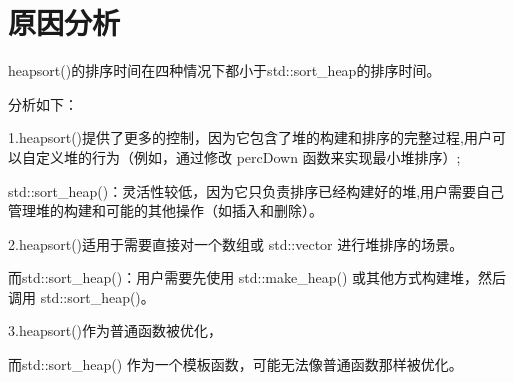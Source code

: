 \documentclass[UTF8]{ctexart}
\begin{document}
\section{原因分析}
heapsort()的排序时间在四种情况下都小于std::sort\_heap的排序时间。

分析如下：

 
1.heapsort()提供了更多的控制，因为它包含了堆的构建和排序的完整过程,用户可以自定义堆的行为（例如，通过修改 percDown 函数来实现最小堆排序）;


std::sort\_heap()：灵活性较低，因为它只负责排序已经构建好的堆,用户需要自己管理堆的构建和可能的其他操作（如插入和删除）。


2.heapsort()适用于需要直接对一个数组或 std::vector 进行堆排序的场景。


  而std::sort\_heap()：用户需要先使用 std::make\_heap() 或其他方式构建堆，然后调用 std::sort\_heap()。
  
3.heapsort()作为普通函数被优化，

而std::sort\_heap() 作为一个模板函数，可能无法像普通函数那样被优化。
\end{document}

